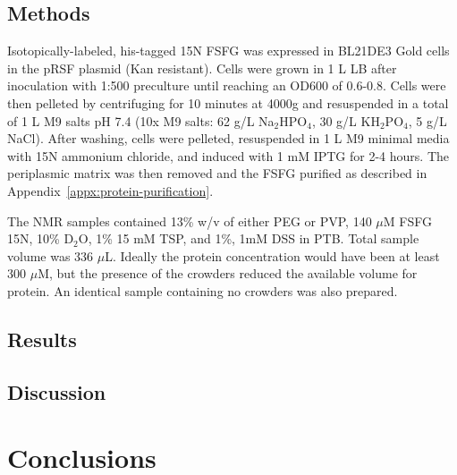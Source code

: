 \subsection{Methods}

Isotopically-labeled, his-tagged 15N FSFG was expressed in BL21DE3 Gold cells in the pRSF plasmid (Kan resistant).  Cells were grown in 1 L LB after inoculation with 1:500 preculture until reaching an OD600 of 0.6-0.8.  Cells were then pelleted by centrifuging for 10 minutes at 4000g and resuspended in a total of 1 L M9 salts pH 7.4 (10x M9 salts: 62 g/L Na$_2$HPO$_4$, 30 g/L KH$_2$PO$_4$, 5 g/L NaCl).  After washing, cells were pelleted, resuspended in 1 L M9 minimal media with 15N ammonium chloride, and induced with 1 mM IPTG for 2-4 hours.  The periplasmic matrix was then removed and the FSFG purified as described in Appendix~\ref{appx:protein-purification}.


The NMR samples contained 13\% w/v of either PEG or PVP, 140 $\mu$M FSFG 15N, 10\% D$_2$O, 1\% 15 mM TSP, and 1\%, 1mM DSS in PTB.  Total sample volume was 336 $\mu$L.  Ideally the protein concentration would have been at least 300 $\mu$M, but the presence of the crowders reduced the available volume for protein.  An identical sample containing no crowders was also prepared.

\subsection{Results}
\subsection{Discussion}


\section{Conclusions}


